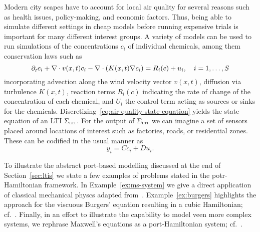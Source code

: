\begin{example}
    Modern city scapes have to account for local air quality for several reasons such as health issues, policy-making, and economic factors.
    Thus, being able to simulate different settings in cheap models before running expensive trials is important for many different interest groups.
    A variety of models can be used to run simulations of the concentrations $c_i$ of individual chemicals, among them conservation laws such as
    \begin{equation}\label{eq:air-quality-state-equation}
        \pd[t]{} c_i + \nabla \cdot v(x, t) c_i - \nabla \cdot (K(x, t) \nabla c_i) = R_i(c) + u_i,\quad i = 1, \dots, S
    \end{equation}
    incorporating advection along the wind velocity vector $v(x, t)$, diffusion via turbulence $K(x, t)$, reaction terms $R_i(c)$ indicating the rate of change of the concentration of each chemical, and $U_i$ the control term acting as sources or sinks for the chemicals.
    Discretizing~\eqref{eq:air-quality-state-equation} yields the state equation of an \ac{LTI} $\Sigma_{\msc{lti}}$.
    For the output of $\Sigma_{\msc{lti}}$ we can imagine a set of sensors placed around locations of interest such as factories, roads, or residential zones.
    These can be codified in the usual manner as
    \begin{equation*}
        y_i = C c_i + D u_i.
    \end{equation*}

\end{example}

To illustrate the abstract port-based modelling discussed at the end of Section~\ref{sec:ltis} we state a few examples of problems stated in the potr-Hamiltonian framework.
In Example~\ref{ex:ms-system} we give a direct application of classical mechanical physcs adapted from~\cite[Example~2.1]{VanDerSchaft2014}.
Example~\ref{ex:burgers} highlights the approach for the viscuous Burgers' equation resulting in a cubic Hamiltonian; cf.~\cite[Example~2.1]{Maschke2005}.
Finally, in an effort to illustrate the capability to model veen more complex systems, we rephrase Maxwell's equations as a port-Hamiltonian system; cf.~\cite[Section~2]{Haine2022}.


